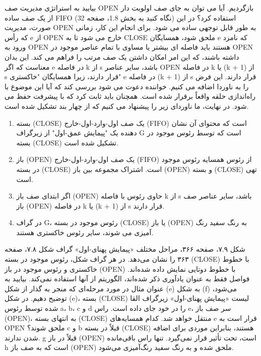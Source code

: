 \documentclass{book} %
\begin{document}
بیایید به استراتژی مدیریت صف OPEN بازگردیم. آیا می توان به جای صف اولویت دار از یک صف ساده FIFO (نگاه کنید به بخش 1.8، صفحه 32) استفاده کرد؟ در این صورت، مدیریت OPEN به طور قابل توجهی ساده می شود. برای انجام این کار، زمانی که رأس e از OPEN خارج می شود تا به CLOSE ملحق شود، همسایگان e که نامزد ورود به OPEN هستند باید فاصله ای بیشتر یا مساوی با تمام عناصر موجود در OPEN داشته باشند، که این امر امکان داشتن یک صف مرتب را فراهم می کند. این بدان معناست که اگر e در فاصله k از s باشد، سایر عناصر OPEN در فاصله k یا (k + 1) از s قرار دارند، زیرا همسایگان "خاکستری" e در فاصله (k + 1) از s قرار دارند. این فرض را به ناوردا اضافه می کنیم. خواننده دعوت می شود بررسی کند که آیا این موضوع با راه‌اندازی حلقه واقعاً برقرار شده است. همچنان باید ثابت کرد که با پیشرفت حفظ می شود. در نهایت، ما ناوردای زیر را پیشنهاد می کنیم که از چهار بند تشکیل شده است.

\begin{enumerate}
    \item  بسته (CLOSE) یک صف اول-وارد-اول-خارج (FIFO) است که محتوای آن نشان دهنده یک "پیمایش عمق-اول" از زیرگراف G است که توسط رئوس موجود در بسته (CLOSE) تشکیل شده است.
    
    \item  باز (OPEN) یک صف اول-وارد-اول-خارج (FIFO) از رئوس همسایه رئوس موجود در بسته (CLOSE) است. اشتراک مجموعه بین باز (OPEN) و بسته (CLOSE) تهی است.

    \item اگر ابتدای صف باز (OPEN) حاوی رئوس با فاصله k از s باشد، سایر عناصر صف باز (OPEN) در فاصله k یا (k + 1) از s قرار دارند.

    \item در گراف G، رئوس موجود در بسته (CLOSE) یا باز (OPEN) به رنگ سفید رنگ آمیزی می شوند، سایر رئوس خاکستری هستند.
\end{enumerate}
\newpage

شکل ۷.۹، صفحه ۳۶۶، مراحل مختلف «پیمایش پهنای-اول» گراف شکل ۷.۸، صفحه ۳۶۳ را نشان می‌دهد. در هر گراف شکل، رئوس موجود در بسته (CLOSE) با خطوط خاکستری و رئوس موجود در باز (OPEN) با خطوط دوتایی نمایش داده شده‌اند. فواصل فقط به عنوان یادآوری ذکر شده‌اند، الگوریتم از آنها استفاده نمی‌کند. بیایید به عنوان مثال در مورد مرحله‌ای که منجر به گذار از شکل (e) به شکل (f) می‌شود، توضیح دهیم. در شکل (e)، بسته (CLOSE) لیست «پیمایش پهنای-اول» زیرگراف القا شده توسط رئوس a، b، c و d را در خود جای داده است. راس e، سر صف باز (OPEN)، به انتهای بسته (CLOSE) منتقل خواهد شد. کدام همسایه‌های e قرار است به OPEN ملحق شوند؟ c و b قبلاً در بسته (CLOSE) هستند، بنابراین موردی برای اضافه شدن ندارند. g  قبلاً در  باز (OPEN) است، تحت تأثیر قرار نمی‌گیرد. تنها راس باقی‌مانده h است که به صف باز (OPEN) ملحق شده و به رنگ سفید رنگ‌آمیزی می‌شود.
\end{document}
